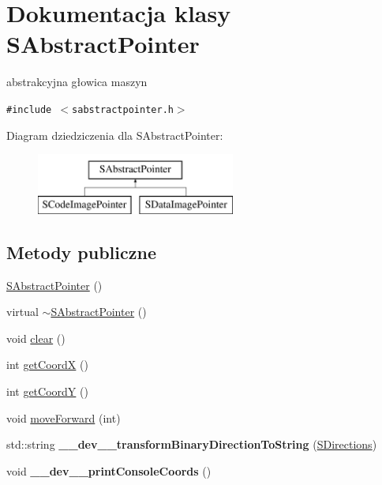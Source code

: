 \hypertarget{classSAbstractPointer}{
\section{Dokumentacja klasy SAbstractPointer}
\label{classSAbstractPointer}
}
abstrakcyjna głowica maszyn  


{\tt \#include $<$sabstractpointer.h$>$}

Diagram dziedziczenia dla SAbstractPointer:\begin{figure}[H]
\begin{center}
\leavevmode
\includegraphics[height=2cm]{classSAbstractPointer}
\end{center}
\end{figure}
\subsection*{Metody publiczne}
\begin{CompactItemize}
\item 
\hyperlink{classSAbstractPointer_9281c3dba0da68460fa87bd17bd768b4}{SAbstractPointer} ()
\item 
virtual \hyperlink{classSAbstractPointer_9973354ecf610b3d48170dd70f0b22ce}{$\sim$SAbstractPointer} ()
\item 
void \hyperlink{classSAbstractPointer_bb15625597bfe9f3927cdc360214bc55}{clear} ()
\item 
int \hyperlink{classSAbstractPointer_0e44b215ff78c8315a4fc4dc12cd4049}{getCoordX} ()
\item 
int \hyperlink{classSAbstractPointer_0226e83b6f838f3ee8491915b9ebab74}{getCoordY} ()
\item 
void \hyperlink{classSAbstractPointer_c4655988c5ae9f94a00e3ccd0ed14863}{moveForward} (int)
\item 
\hypertarget{classSAbstractPointer_5d7349c25205be738561fa791a77a3b8}{
std::string \textbf{\_\-\_\-dev\_\-\_\-transformBinaryDirectionToString} (\hyperlink{senums_8h_039d4115103dc22e0555ecc968fecbf0}{SDirections})}
\label{classSAbstractPointer_5d7349c25205be738561fa791a77a3b8}

\item 
\hypertarget{classSAbstractPointer_3faa92c6a0de5ea971a7d32ceb51980f}{
void \textbf{\_\-\_\-dev\_\-\_\-printConsoleCoords} ()}
\label{classSAbstractPointer_3faa92c6a0de5ea971a7d32ceb51980f}

\end{CompactItemize}
